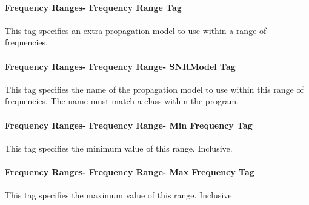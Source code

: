 \documentclass[../main.tex]{subfiles}
\begin{document}
\paragraph{Frequency Ranges- Frequency Range Tag}
This tag specifies an extra propagation model to use within a range of frequencies.

\paragraph{Frequency Ranges- Frequency Range- SNRModel Tag}
This tag specifies the name of the propagation model to use within this range of frequencies.
The name must match a class within the program.

\paragraph{Frequency Ranges- Frequency Range- Min Frequency Tag}
This tag specifies the minimum value of this range.
Inclusive.

\paragraph{Frequency Ranges- Frequency Range- Max Frequency Tag}
This tag specifies the maximum value of this range.
Inclusive.
\end{document}
